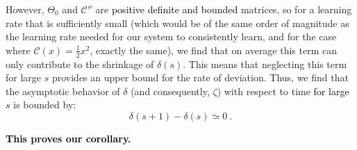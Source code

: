 \documentclass{article} %
\begin{document}
However, \(\Theta_0\) and \(\mathcal{C}''\) are \textcolor{black}{positive definite and bounded} matrices, so for a learning rate that is sufficiently small (which would be of the same order of magnitude as the learning rate needed for our system to consistently learn, and for the case where \(\mathcal{C}(x)=\frac{1}{2}x^2\), exactly the same), we find that on average this term can only contribute to the shrinkage of \(\delta(s)\). This means that neglecting this term for large \(s\) provides an upper bound for the rate of deviation. Thus, we find that the asymptotic behavior of \(\delta\) (and consequently, \(\zeta\)) with respect to time \textcolor{black}{for large \(s\)} is bounded by:
\begin{equation}
\delta\left(s+1\right)-\delta\left(s\right)\simeq0 \ .
\end{equation}

\textbf{\textcolor{black}{This proves our corollary.}}
\end{document}
